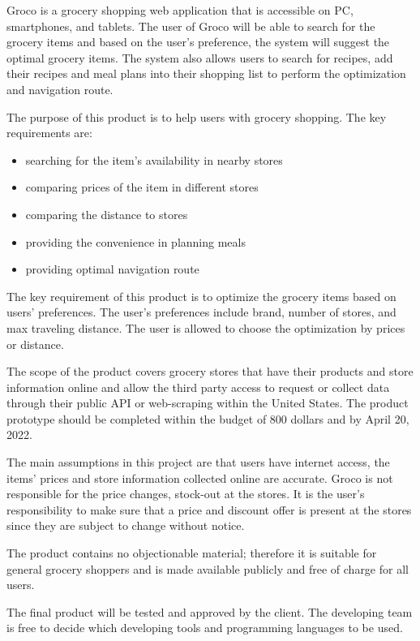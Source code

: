 Groco is a grocery shopping web application that is accessible on PC, smartphones, and tablets. The user of Groco will be able to search for the grocery items and based on the user's preference, the system will suggest the optimal grocery items. The system also allows users to search for recipes, add their recipes and meal plans into their shopping list to perform the optimization and navigation route.

The purpose of this product is to help users with grocery shopping. The key requirements are:
\begin{itemize}
    \item searching for the item's availability in nearby stores
    \item comparing prices of the item in different stores
    \item comparing the distance to stores
    \item providing the convenience in planning meals
    \item providing optimal navigation route 
\end{itemize} 

The key requirement of this product is to optimize the grocery items based on users' preferences. The user's preferences include brand, number of stores, and max traveling distance. The user is allowed to choose the optimization by prices or distance.  

The scope of the product covers grocery stores that have their products and store information online and allow the third party access to request or collect data through their public API or web-scraping within the United States. The product prototype should be completed within the budget of 800 dollars and by April 20, 2022.

The main assumptions in this project are that users have internet access, the items' prices and store information collected online are accurate. Groco is not responsible for the price changes, stock-out at the stores. It is the user's responsibility to make sure that a price and discount offer is present at the stores since they are subject to change without notice.

The product contains no objectionable material; therefore it is suitable for general grocery shoppers and is made available publicly and free of charge for all users.

The final product will be tested and approved by the client. The developing team is free to decide which developing tools and programming languages to be used.

